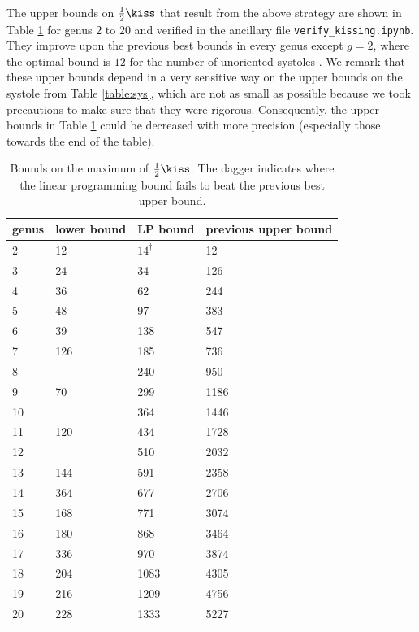 \documentclass[12pt]{amsart}
\numberwithin{equation}{section}
\begin{document}
The upper bounds on $\frac12 \kiss$ that result from the above strategy are shown in Table \ref{table:kiss} for genus $2$ to $20$ and verified in the ancillary file \texttt{verify\_kissing.ipynb}. They improve upon the previous best bounds in every genus except $g=2$, where the optimal bound is $12$ for the number of unoriented systoles \cite{SchmutzKissing}. We remark that these upper bounds depend in a very sensitive way on the upper bounds on the systole from Table \ref{table:sys}, which are not as small as possible because we took precautions to make sure that they were rigorous. Consequently, the upper bounds in Table \ref{table:kiss} could be decreased with more precision (especially those towards the end of the table).

{\footnotesize
\begin{table}[htp]
\centering
\caption{Bounds on the maximum of $\frac12\kiss$. The dagger indicates where the linear programming bound fails to beat the previous best upper bound.}  \label{table:kiss}
\begin{tabular}{|l|l|l|l|}
\hline
genus & lower bound & LP bound & previous upper bound  \\
\hline
2 & 12 \cite{Jenni} & $14^\dagger$ & 12 \cite{SchmutzKissing}\\
3 & 24 \cite{SchmutzMaxima}& 34 & 126 \cite{MRT}\\
4 & 36 \cite{SchmutzMaxima}& 62  & 244 \cite{KissingManifolds} \\
5 & 48 \cite{SchmutzMaxima}& 97 & 383 \cite{KissingManifolds} \\
6 &  39 \cite{Hamenstadt}   & 138 & 547 \cite{KissingManifolds}\\
7 & 126 \cite{VogelerThesis} & 185 & 736 \cite{KissingManifolds}\\
8 &       & 240 & 950 \cite{KissingManifolds}\\
9 &  70 \cite{SchmutzMaxima}     & 299 & 1186 \cite{KissingManifolds} \\
10 &     & 364 & 1446 \cite{KissingManifolds}\\
11 &  120 \cite{SchmutzMaxima}   & 434 & 1728 \cite{KissingManifolds}\\
12 &     & 510 & 2032 \cite{KissingManifolds}\\
13 & 144 \cite{FBRafi} & 591 & 2358 \cite{KissingManifolds}\\
14 & 364 \cite{VogelerThesis} & 677 & 2706 \cite{KissingManifolds}\\
15 & 168 \cite{FBRafi} & 771 & 3074 \cite{KissingManifolds}\\
16 & 180 \cite{FBRafi} & 868 & 3464 \cite{KissingManifolds}\\
17 & 336 \cite{VogelerThesis} & 970 & 3874 \cite{KissingManifolds}\\
18 &  204 \cite{FBRafi} & 1083 & 4305 \cite{KissingManifolds}\\
19 & 216 \cite{FBRafi} & 1209 & 4756 \cite{KissingManifolds}\\
20 & 228 \cite{FBRafi} & 1333 & 5227 \cite{KissingManifolds}\\
\hline
\end{tabular}
\end{table}
}
\end{document}
